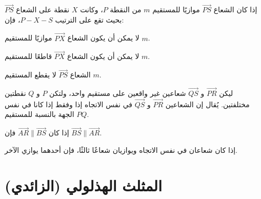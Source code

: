 \begin{theorem}
	إذا كان الشعاع $\overrightarrow{PS}$ موازيًا للمستقيم $m$ من النقطة $P$، وكانت $X$ نقطة على الشعاع $\overrightarrow{PS}$ بحيث تقع على الترتيب $P - X - S$، فإن:\\
	\begin{tasks*}
		\item لا يمكن أن يكون الشعاع $\overrightarrow{PX}$ موازيًا للمستقيم $m$.
		\item لا يمكن أن يكون الشعاع $\overrightarrow{PX}$ قاطعًا للمستقيم $m$.
		\item الشعاع $\overrightarrow{PS}$ لا يقطع المستقيم $m$.
	\end{tasks*}
\end{theorem}

\begin{definition}
	ليكن $\overrightarrow{PR}$ و $\overrightarrow{QS}$ شعاعين غير واقعين على مستقيم واحد، ولتكن $P$ و $Q$ نقطتين مختلفتين. يُقال إن الشعاعين $\overrightarrow{PR}$ و $\overrightarrow{QS}$ في نفس الاتجاه إذا وفقط إذا كانا في نفس الجهة بالنسبة للمستقيم $PQ$.
\end{definition}

\begin{theorem}
	إذا كان $\overrightarrow{AR} \parallel \overrightarrow{BS}$ فإن $\overrightarrow{BS} \parallel \overrightarrow{AR}$.
\end{theorem}

\begin{theorem}
	إذا كان شعاعان في نفس الاتجاه ويوازيان شعاعًا ثالثًا، فإن أحدهما يوازي الآخر.
\end{theorem}

\section[المثلث الهذلولي (الزائدي)]{المثلث الهذلولي (الزائدي) \cite{ref4}}

